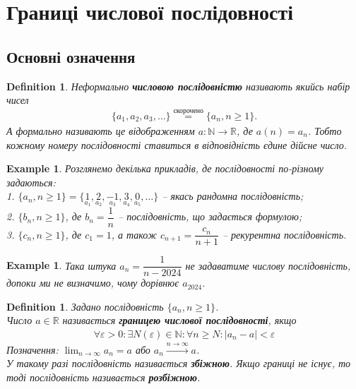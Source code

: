 \documentclass[a4paper, 14pt]{article}
\theoremstyle{theoremdd}
\theoremstyle{theoremdd}
\newtheorem{definition}[theorem]{Definition}
\theoremstyle{theoremdd}
\theoremstyle{theoremdd}
\newtheorem{example}[theorem]{Example}
\theoremstyle{theoremdd}
\theoremstyle{theoremdd}
\theoremstyle{theoremdd}
\theoremstyle{theoremdd}
\begin{document}
	\section{Границі числової послідовності}
	\subsection{Основні означення}
	\begin{definition}
	Неформально \textbf{числовою послідовністю} називають якийсь набір чисел 
	\begin{align*}
	\{a_1,a_2,a_3, \dots\} \overset{\text{скорочено}}{=} \{a_n, n \geq 1\}.
	\end{align*}
	А формально називають це відображенням $a \colon \mathbb{N} \to \mathbb{R}$, де $a(n) = a_n$. Тобто кожному номеру послідовності ставиться в відповідність єдине дійсне число.
	\end{definition}
	
	\begin{example}
	Розглянемо декілька прикладів, де послідовності по-різному задаються:\\
	1. $\{a_n, n \geq 1\} = \{\underset{a_1}{1},\underset{a_2}{2},\underset{a_3}{-1},\underset{a_4}{3},\underset{a_5}{0},\dots\}$ -- якась рандомна послідовність;\\
	2. $\{b_n, n \geq 1\}$, де $b_n = \dfrac{1}{n}$ -- послідовність, що задається формулою;\\
	3. $\{c_n, n \geq 1\}$, де $c_1 = 1$, а також $c_{n+1} = \dfrac{c_n}{n+1}$ -- рекурентна послідовність.
	\end{example}
	
	\begin{example}
	Така штука $a_n = \dfrac{1}{n - 2024}$ не задаватиме числову послідовність, допоки ми не визначимо, чому дорівнює $a_{2024}$.
	\end{example}
	
	\begin{definition} Задано послідовність $\{a_n, n \geq 1\}$.\\
	Число $a \in \mathbb{R}$ називається \textbf{границею числової послідовності}, якщо
	\begin{align*}
	\forall \varepsilon > 0: \exists N(\varepsilon) \in \mathbb{N}: \forall n \geq N: |a_n - a| < \varepsilon
	\end{align*}
	Позначення: $\displaystyle \lim_{n \to \infty} a_n = a$ або $a_n \xrightarrow{n \to \infty} a$.\\
	У такому разі послідовність називається \textbf{збіжною}. Якщо границі не існує, то тоді послідовність називається \textbf{розбіжною}.
	\end{definition}
	
\end{document}
